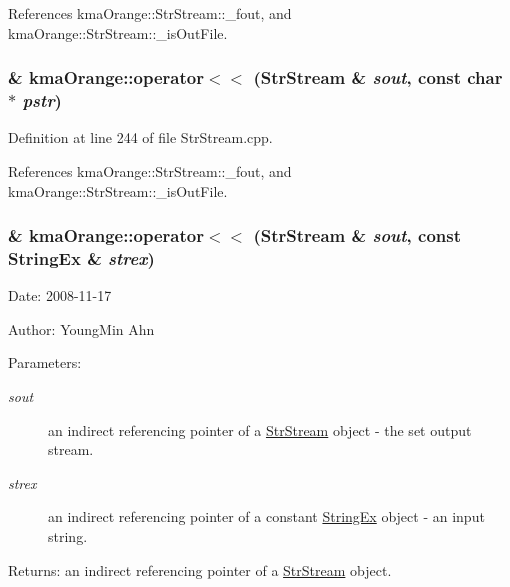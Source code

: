 References kmaOrange::StrStream::\_\-fout, and kmaOrange::StrStream::\_\-isOutFile.\hypertarget{namespacekmaOrange_0b9aa2b83b5581803669bcb812a5531a}{
\subsubsection[{operator$<$$<$}]{\& kmaOrange::operator$<$$<$ ({\bf StrStream} \& {\em sout}, \/  const char $\ast$ {\em pstr})}}
\label{namespacekmaOrange_0b9aa2b83b5581803669bcb812a5531a}




Definition at line 244 of file StrStream.cpp.

References kmaOrange::StrStream::\_\-fout, and kmaOrange::StrStream::\_\-isOutFile.\hypertarget{namespacekmaOrange_eaaf55ae03c3fd6d11fbbd9dec9f8745}{
\subsubsection[{operator$<$$<$}]{\& kmaOrange::operator$<$$<$ ({\bf StrStream} \& {\em sout}, \/  const {\bf StringEx} \& {\em strex})}}
\label{namespacekmaOrange_eaaf55ae03c3fd6d11fbbd9dec9f8745}


\begin{Desc}
\item[Date:]2008-11-17 \end{Desc}
\begin{Desc}
\item[Author:]YoungMin Ahn \end{Desc}
\begin{Desc}
\item[Parameters:]
\begin{description}
\item[{\em sout}]an indirect referencing pointer of a \hyperlink{classkmaOrange_1_1StrStream}{StrStream} object - the set output stream. \item[{\em strex}]an indirect referencing pointer of a constant \hyperlink{classStringEx}{StringEx} object - an input string. \end{description}
\end{Desc}
\begin{Desc}
\item[Returns:]an indirect referencing pointer of a \hyperlink{classkmaOrange_1_1StrStream}{StrStream} object. \end{Desc}


